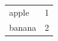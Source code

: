 \documentclass{article}
\begin{document}
\begin{tcolorbox}[enhanced, title=Demo]
\begin{tabular}{ll}
apple & 1 \\
banana & 2 \\
\end{tabular}
\end{tcolorbox}
\end{document}
